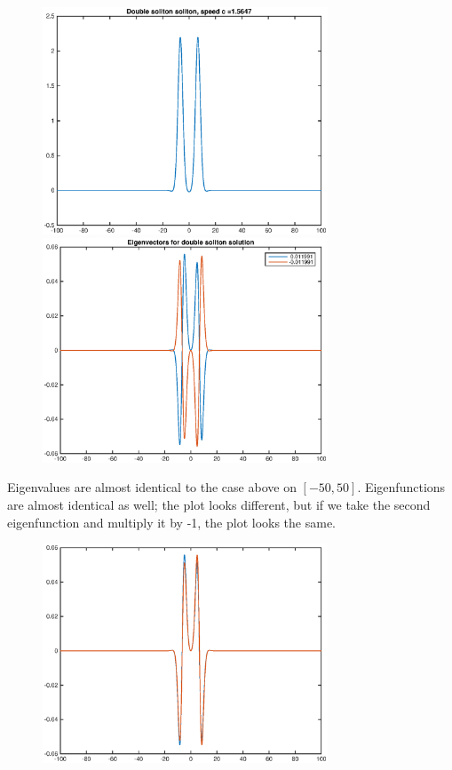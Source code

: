 \documentclass[12pt]{article}
\begin{document}
\begin{enumerate}
	\begin{figure}[H]
	\includegraphics[width=8.5cm]{double1_FD100.eps}
	\includegraphics[width=8.5cm]{double1_FD100_vec.eps}
	\end{figure}

	Eigenvalues are almost identical to the case above on $[-50,50]$. Eigenfunctions are almost identical as well; the plot looks different, but if we take the second eigenfunction and multiply it by -1, the plot looks the same.

	\begin{figure}[H]
	\includegraphics[width=8.5cm]{double1_FD100_vec2.eps}
	\end{figure}


\end{enumerate}
\end{document}
